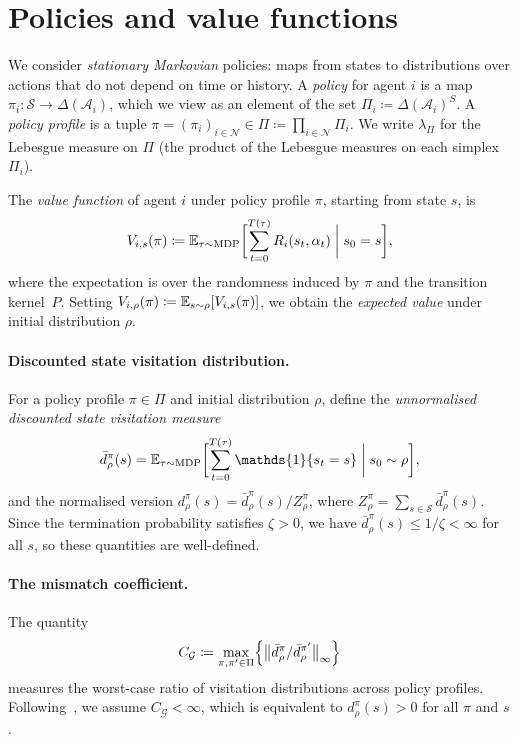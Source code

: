 \documentclass[a4paper,oneside,11pt]{report}
\newcommand{\ind}{\mathds{1}}
\newcommand{\calS}{\mathcal{S}}
\newcommand{\calN}{\mathcal{N}}
\newcommand{\calA}{\mathcal{A}}
\newcommand{\calG}{\mathcal{G}}
\numberwithin{theorem}{chapter}
\numberwithin{equation}{chapter}
\begin{document}
\section{Policies and value functions}
\label{sec:policies}

We consider \emph{stationary Markovian} policies: maps from states to
distributions over actions that do not depend on time or history. A
\emph{policy} for agent $i$ is a map
$\pi_i \colon \calS \to \Delta(\calA_i)$, which we view as an element
of the set $\Pi_i \coloneqq \Delta(\calA_i)^S$. A \emph{policy profile}
is a tuple $\pi = (\pi_i)_{i \in \calN} \in \Pi \coloneqq \prod_{i \in \calN} \Pi_i$.
We write $\lambda_\Pi$ for the Lebesgue measure on $\Pi$ (the product
of the Lebesgue measures on each simplex $\Pi_i$).

The \emph{value function} of agent $i$ under policy profile $\pi$,
starting from state $s$, is
\begin{equation}
  \label{eq:value-function}
  V_{i,s}(\pi) \coloneqq \mathbb{E}_{\tau \sim \mathrm{MDP}}\biggl[
    \sum_{t=0}^{T(\tau)} R_i(s_t, \alpha_t) \biggm| s_0 = s
  \biggr],
\end{equation}
where the expectation is over the randomness induced by $\pi$ and the
transition kernel~$P$. Setting
$V_{i,\rho}(\pi) \coloneqq \mathbb{E}_{s \sim \rho}[V_{i,s}(\pi)]$, we obtain
the \emph{expected value} under initial distribution $\rho$.

\paragraph{Discounted state visitation distribution.}
For a policy profile $\pi \in \Pi$ and initial distribution $\rho$,
define the \emph{unnormalised discounted state visitation measure}
\begin{equation}
  \label{eq:visitation}
  \bar{d}^\pi_\rho(s) = \E_{\tau \sim \mathrm{MDP}}\biggl[
    \sum_{t=0}^{T(\tau)} \ind\{s_t = s\} \biggm| s_0 \sim \rho
  \biggr],
\end{equation}
and the normalised version
$d^\pi_\rho(s) = \bar{d}^\pi_\rho(s) / Z^\pi_\rho$, where
$Z^\pi_\rho = \sum_{s \in \calS} \bar{d}^\pi_\rho(s)$. Since the
termination probability satisfies $\zeta > 0$, we have
$\bar{d}^\pi_\rho(s) \le 1/\zeta < \infty$ for all $s$, so these
quantities are well-defined.

\paragraph{The mismatch coefficient.}
The quantity
\begin{equation}
  \label{eq:mismatch}
  C_\calG \coloneqq \max_{\pi, \pi' \in \Pi}
  \Bigl\{ \bigl\| \bar{d}^\pi_\rho / \bar{d}^{\pi'}_\rho
  \bigr\|_\infty \Bigr\}
\end{equation}
measures the worst-case ratio of visitation distributions across policy
profiles. Following~\cite{agarwal2021, giannou2022}, we assume
$C_\calG < \infty$, which is equivalent to
$d^\pi_\rho(s) > 0$ for all $\pi$ and $s$.
\end{document}
